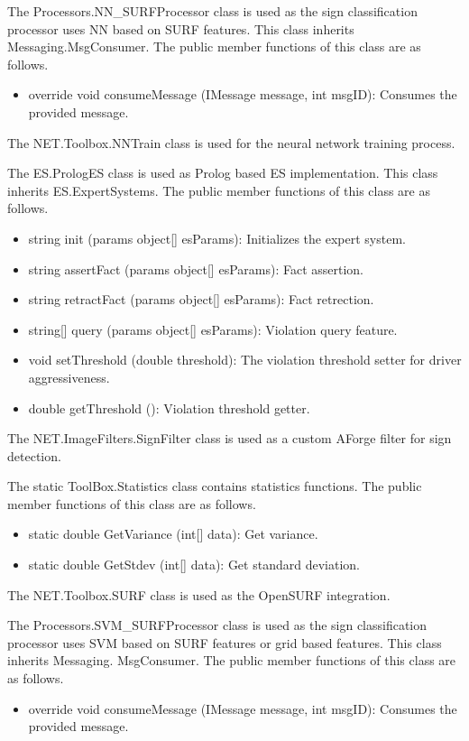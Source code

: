 \documentclass[a4paper,oneside,12pt]{report}
\begin{document}
The Processors.NN\_SURFProcessor class is used as the sign classification processor uses NN based on SURF features.
This class inherits Messaging.MsgConsumer. The public member functions of this class are as follows.
\begin{itemize}
\item override void consumeMessage (IMessage message, int msgID): Consumes the provided message. 
\end{itemize}

The NET.Toolbox.NNTrain class is used for the neural network training process.

The ES.PrologES class is used as Prolog based ES implementation.
This class inherits ES.ExpertSystems. The public member functions of this class are as follows.
\begin{itemize}
\item string init (params object[] esParams): Initializes the expert system. 
\item string assertFact (params object[] esParams): Fact assertion. 
\item string retractFact (params object[] esParams): Fact retrection. 
\item string[] query (params object[] esParams): Violation query feature. 
\item void setThreshold (double threshold): The violation threshold setter for driver aggressiveness. 
\item double getThreshold (): Violation threshold getter. 
\end{itemize}

The NET.ImageFilters.SignFilter class is used as a custom AForge filter for sign detection. 

The static ToolBox.Statistics class contains statistics functions.
The public member functions of this class are as follows.
\begin{itemize}
\item static double GetVariance (int[] data): Get variance. 
\item static double GetStdev (int[] data): Get standard deviation. 
\end{itemize}

The NET.Toolbox.SURF class is used as the OpenSURF integration. 

The Processors.SVM\_SURFProcessor class is used as the sign classification processor uses SVM based on SURF features or grid based features.
This class inherits Messaging. MsgConsumer. The public member functions of this class are as follows.
\begin{itemize}
\item override void consumeMessage (IMessage message, int msgID): Consumes the provided message. 
\end{itemize}
\end{document}
